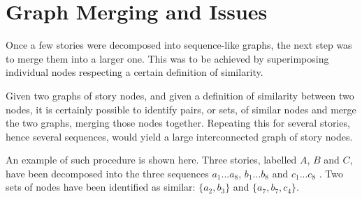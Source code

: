 \documentclass[12pt,a4paper,oneside]{report}
\begin{document}
\pagebreak

\section{Graph Merging and Issues}

Once a few stories were decomposed into sequence-like graphs, the next step was to merge them into a larger one. This was to be achieved by superimposing individual nodes respecting a certain definition of similarity. 

Given two graphs of story nodes, and given a definition of similarity between two nodes, it is certainly possible to identify pairs, or sets, of similar nodes and merge the two graphs, merging those nodes together. Repeating this for several stories, hence several sequences, would yield a large interconnected graph of story nodes.

\bigskip

An example of such procedure is shown here. Three stories, labelled \(A\), \(B\) and \(C\), have been decomposed into the three sequences \(a_1 ... a_8\), \(b_1 ... b_8\) and \(c_1 ... c_8\) . Two sets of nodes have been identified as similar: \(\{a_2,b_3\}\) and \(\{a_7,b_7,c_4\}\). 
\end{document}
